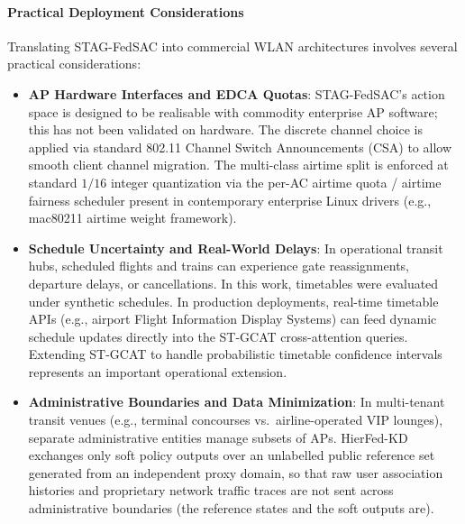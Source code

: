\paragraph{Practical Deployment Considerations}
Translating STAG-FedSAC into commercial WLAN architectures involves several practical considerations:
\begin{itemize}
  \item \textbf{AP Hardware Interfaces and EDCA Quotas}: STAG-FedSAC's action space is designed to be realisable with commodity enterprise AP software; this has not been validated on hardware. The discrete channel choice is applied via standard 802.11 Channel Switch Announcements (CSA) to allow smooth client channel migration. The multi-class airtime split is enforced at standard $1/16$ integer quantization via the per-AC airtime quota / airtime fairness scheduler present in contemporary enterprise Linux drivers (e.g., mac80211 airtime weight framework).
  \item \textbf{Schedule Uncertainty and Real-World Delays}: In operational transit hubs, scheduled flights and trains can experience gate reassignments, departure delays, or cancellations. In this work, timetables were evaluated under synthetic schedules. In production deployments, real-time timetable APIs (e.g., airport Flight Information Display Systems) can feed dynamic schedule updates directly into the ST-GCAT cross-attention queries. Extending ST-GCAT to handle probabilistic timetable confidence intervals represents an important operational extension.
  \item \textbf{Administrative Boundaries and Data Minimization}: In multi-tenant transit venues (e.g., terminal concourses vs.\ airline-operated VIP lounges), separate administrative entities manage subsets of APs. HierFed-KD exchanges only soft policy outputs over an unlabelled public reference set generated from an independent proxy domain, so that raw user association histories and proprietary network traffic traces are not sent across administrative boundaries (the reference states and the soft outputs are).
\end{itemize}

